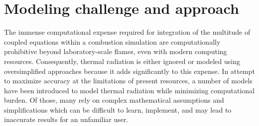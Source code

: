 









\section{Modeling challenge and approach}
The immense computational expense required for integration of the multitude of coupled equations within a combustion simulation are computationally prohibitive beyond laboratory-scale flames, even with modern computing resources. Consequently, thermal radiation is either ignored or modeled using oversimplified approaches because it adds significantly to this expense.
In attempt to maximize accuracy at the limitations of present resources, a number of models have been introduced to model thermal radiation while minimizing computational burden.
Of those, many rely on complex mathematical assumptions and simplifications which can be difficult to learn, implement, and may lead to inaccurate results for an unfamiliar user. 


